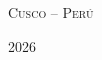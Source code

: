 \begin{titlepage}
  \vfill
  {\scshape Cusco -- Perú}\par
  \vspace{0.3em}
  {2026}\par

\end{titlepage}
